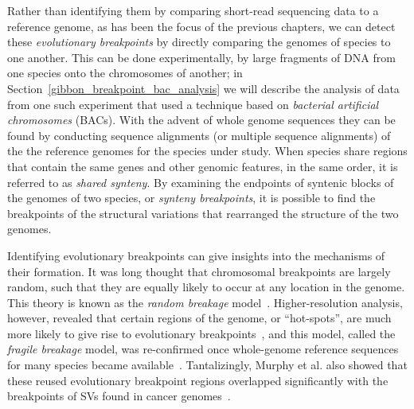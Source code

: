 Rather than identifying them by comparing short-read sequencing data to a reference genome, as has been the focus of the previous chapters, we can detect these \emph{evolutionary breakpoints} by directly comparing the genomes of species to one another. This can be done experimentally, by large fragments of DNA from one species onto the chromosomes of another; in Section~\ref{gibbon_breakpoint_bac_analysis} we will describe the analysis of data from one such experiment that used a technique based on \emph{bacterial artificial chromosomes} (BACs). With the advent of whole genome sequences they can be found by conducting sequence alignments (or multiple sequence alignments) of the the reference genomes for the species under study. When species share regions that contain the same genes and other genomic features, in the same order, it is referred to as \emph{shared synteny}. By examining the endpoints of syntenic blocks of the genomes of two species, or \emph{synteny breakpoints}, it is possible to find the breakpoints of the structural variations that rearranged the structure of the two genomes.

Identifying evolutionary breakpoints can give insights into the mechanisms of their formation. It was long thought that chromosomal breakpoints are largely random, such that they are equally likely to occur at any location in the genome. This theory is known as the \emph{random breakage} model~\cite{Ono:1973tr,Nadeau:1984tm}. Higher-resolution analysis, however, revealed that certain regions of the genome, or ``hot-spots'', are much more likely to give rise to evolutionary breakpoints~\cite{Pevzner:2003ba}, and this model, called the \emph{fragile breakage} model, was re-confirmed once whole-genome reference sequences for many species became available~\cite{Murphy:2005hv}. Tantalizingly, Murphy et al. also showed that these reused evolutionary breakpoint regions overlapped significantly with the breakpoints of SVs found in cancer genomes~\cite{Murphy:2005hv}.

